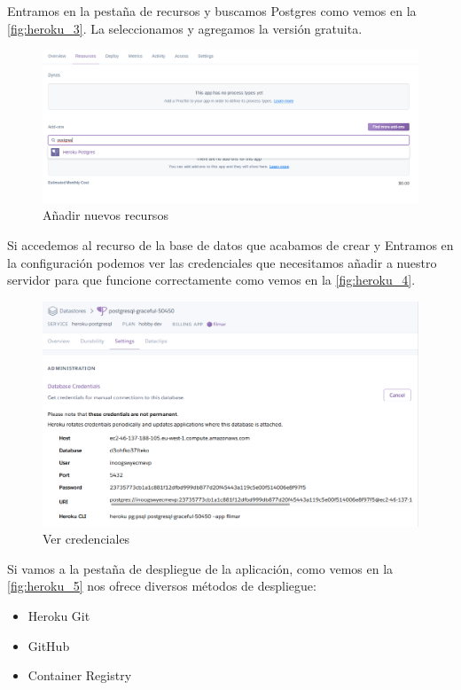 Entramos en la pestaña de recursos y buscamos Postgres como vemos en la
\autoref{fig:heroku_3}. La seleccionamos y agregamos la versión gratuita.
\begin{figure}[H]
    \centering
    \includegraphics[width=6in]{figures/appendix-A/heroku_3.png}
    \caption{Añadir nuevos recursos}
    \label{fig:heroku_3}
\end{figure}
Si accedemos al recurso de la base de datos que acabamos de crear y Entramos
 en la configuración podemos ver las credenciales que necesitamos añadir a
 nuestro servidor para que funcione correctamente como vemos en la
 \autoref{fig:heroku_4}.
\begin{figure}[H]
    \centering
    \includegraphics[width=6in]{figures/appendix-A/heroku_4.png}
    \caption{Ver credenciales}
    \label{fig:heroku_4}
\end{figure}
Si vamos a la pestaña de despliegue de la aplicación, como vemos en la
 \autoref{fig:heroku_5} nos ofrece diversos métodos de
 despliegue:
\begin{itemize}
    \item Heroku Git
    \item GitHub
    \item Container Registry
\end{itemize}
